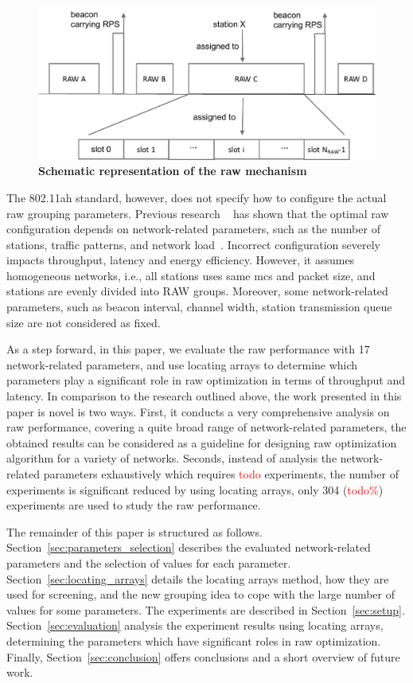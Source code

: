 \begin{figure}[t]
  \centering
  \includegraphics[width=0.8\columnwidth]{image/raw.pdf}
  \caption{\textbf{Schematic representation of the \gls{raw} mechanism}\label{fig:RAW}}
\end{figure}

The 802.11ah standard, however, does not specify how to configure the actual \gls{raw} grouping parameters. Previous research ~\cite{WoWMoM2016} has shown that the optimal \gls{raw} configuration depends on network-related parameters, such as the number of stations, traffic patterns, and network load~\cite{WoWMoM2016}. Incorrect configuration severely impacts throughput, latency and energy efficiency. However, it assumes homogeneous networks, i.e., all stations uses same \gls{mcs} and packet size, and stations are evenly divided into RAW groups. Moreover, some network-related parameters, such as beacon interval, channel width, station transmission queue size are not considered as fixed. 

As a step forward, in this paper, we evaluate the \gls{raw} performance with 17 network-related parameters, and use locating arrays to determine which parameters play a significant role in \gls{raw} optimization in terms of throughput and latency. In comparison to the research outlined above, the work presented in this paper is novel is two ways. First, it conducts a very comprehensive analysis on \gls{raw} performance, covering a quite broad range of network-related parameters, the obtained results can be considered as a guideline for designing \gls{raw} optimization algorithm for a variety of networks. Seconds, instead of analysis the network-related parameters exhaustively which requires \textcolor{red}{todo} experiments, the number of experiments is significant reduced by using locating arrays, only 304 (\textcolor{red}{todo\%}) experiments are used to study the \gls{raw} performance.

The remainder of this paper is structured as follows. Section~\ref{sec:parameters_selection} describes the evaluated network-related parameters and the selection of values for each parameter. 
Section~\ref{sec:locating_arrays} details the locating arrays method, how they are used for screening, and the new grouping idea to cope with the large number of values for some parameters. The experiments are described in Section~\ref{sec:setup}. Section~\ref{sec:evaluation} analysis the experiment results using locating arrays, determining the parameters which have significant roles in \gls{raw} optimization.
Finally, Section~\ref{sec:conclusion} offers conclusions and a short overview of future work.



